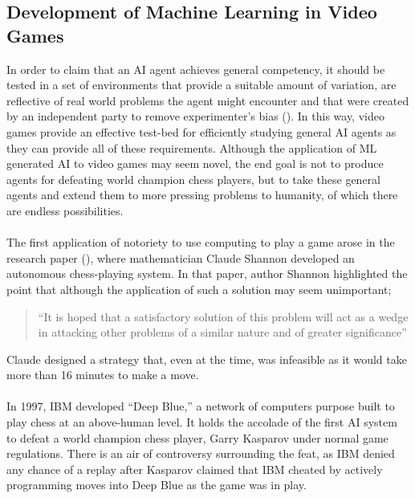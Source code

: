 \subsection{Development of Machine Learning in Video Games}
In order to claim that an AI agent achieves general competency, it should be tested in a set of
environments that provide a suitable amount of variation, are reflective of real world problems the
agent might encounter and that were created by an independent party to remove experimenter's bias
(\citet{ale-eval-plat}). In this way, video games provide an effective test-bed for efficiently
studying general AI agents as they can provide all of these requirements. Although the application
of ML generated AI to video games may seem novel, the end goal is not to produce agents for
defeating world champion chess players, but to take these general agents and extend them to more
pressing problems to humanity, of which there are endless possibilities. \paragraph{}

The first application of notoriety to use computing to play a game arose in the research paper (\citet{programming-comp-chess}), where
mathematician Claude Shannon developed an autonomous chess-playing system. In that paper, author
Shannon highlighted the point that although the application of such a solution may seem
unimportant;
\begin{quote}
    ``It is hoped that a satisfactory solution of this problem will act as a wedge in attacking
    other problems of a similar nature and of greater significance''
\end{quote}
Claude designed a strategy that, even at the time, was infeasible as it would take more than 16
minutes to make a move. \paragraph{}

In 1997, IBM developed ``Deep Blue,'' a network of computers purpose built to play
chess at an above-human level. It holds the accolade of the first AI system to defeat a world champion
chess player, Garry Kasparov under normal game regulations. There is an air of controversy
surrounding the feat, as IBM denied any chance of a replay after Kasparov claimed that IBM cheated
by actively programming moves into Deep Blue as the game was in play. \paragraph{}

